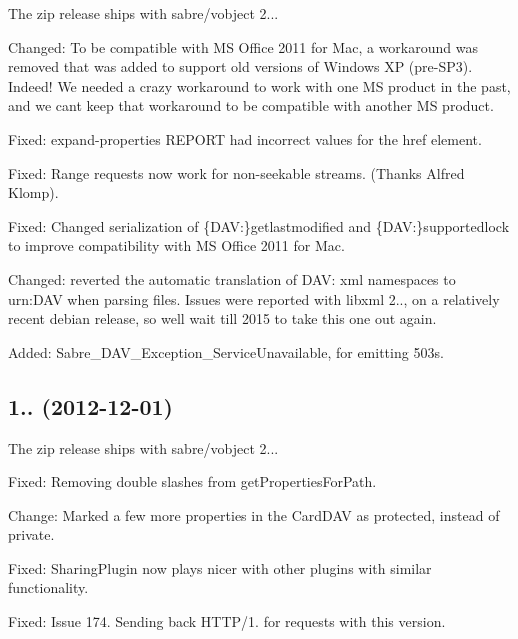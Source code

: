 \begin{DoxyItemize}
\item The zip release ships with sabre/vobject 2...
\item Changed\+: To be compatible with MS Office 2011 for Mac, a workaround was removed that was added to support old versions of Windows XP (pre-\/\+S\+P3). Indeed! We needed a crazy workaround to work with one MS product in the past, and we can\textquotesingle{}t keep that workaround to be compatible with another MS product.
\item Fixed\+: expand-\/properties R\+E\+P\+O\+RT had incorrect values for the href element.
\item Fixed\+: Range requests now work for non-\/seekable streams. (Thanks Alfred Klomp).
\item Fixed\+: Changed serialization of \{D\+AV\+:\}getlastmodified and \{D\+AV\+:\}supportedlock to improve compatibility with MS Office 2011 for Mac.
\item Changed\+: reverted the automatic translation of \textquotesingle{}D\+AV\+:\textquotesingle{} xml namespaces to \textquotesingle{}urn\+:D\+AV\textquotesingle{} when parsing files. Issues were reported with libxml 2.., on a relatively recent debian release, so we\textquotesingle{}ll wait till 2015 to take this one out again.
\item Added\+: Sabre\+\_\+\+D\+A\+V\+\_\+\+Exception\+\_\+\+Service\+Unavailable, for emitting 503\textquotesingle{}s.
\end{DoxyItemize}

\subsection*{1.. (2012-\/12-\/01) }


\begin{DoxyItemize}
\item The zip release ships with sabre/vobject 2...
\item Fixed\+: Removing double slashes from get\+Properties\+For\+Path.
\item Change\+: Marked a few more properties in the Card\+D\+AV as protected, instead of private.
\item Fixed\+: Sharing\+Plugin now plays nicer with other plugins with similar functionality.
\item Fixed\+: Issue 174. Sending back H\+T\+T\+P/1. for requests with this version.
\end{DoxyItemize}

